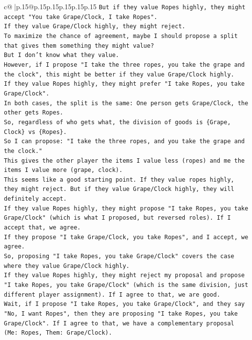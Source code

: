 \documentclass{article}
\begin{document}
{\begin{supertabular}{c@{$\;$}|p{.15\linewidth}@{}p{.15\linewidth}p{.15\linewidth}p{.15\linewidth}p{.15\linewidth}p{.15\linewidth}}
{{{\texttt{But if they value Ropes highly, they might accept "You take Grape/Clock, I take Ropes".} \\
\texttt{If they value Grape/Clock highly, they might reject.} \\
\texttt{To maximize the chance of agreement, maybe I should propose a split that gives them something they might value?} \\
\texttt{But I don't know what they value.} \\
\texttt{However, if I propose "I take the three ropes, you take the grape and the clock", this might be better if they value Grape/Clock highly.} \\
\texttt{If they value Ropes highly, they might prefer "I take Ropes, you take Grape/Clock".} \\
\texttt{In both cases, the split is the same: One person gets Grape/Clock, the other gets Ropes.} \\
\texttt{So, regardless of who gets what, the division of goods is \{Grape, Clock\} vs \{Ropes\}.} \\
\texttt{So I can propose: "I take the three ropes, and you take the grape and the clock."} \\
\texttt{This gives the other player the items I value less (ropes) and me the items I value more (grape, clock).} \\
\texttt{This seems like a good starting point. If they value ropes highly, they might reject. But if they value Grape/Clock highly, they will definitely accept.} \\
\texttt{If they value Ropes highly, they might propose "I take Ropes, you take Grape/Clock" (which is what I proposed, but reversed roles). If I accept that, we agree.} \\
\texttt{If they propose "I take Grape/Clock, you take Ropes", and I accept, we agree.} \\
\texttt{So, proposing "I take Ropes, you take Grape/Clock" covers the case where they value Grape/Clock highly.} \\
\texttt{If they value Ropes highly, they might reject my proposal and propose "I take Ropes, you take Grape/Clock" (which is the same division, just different player assignment). If I agree to that, we are good.} \\
\texttt{Wait, if I propose "I take Ropes, you take Grape/Clock", and they say "No, I want Ropes", then they are proposing "I take Ropes, you take Grape/Clock". If I agree to that, we have a complementary proposal (Me: Ropes, Them: Grape/Clock).} \\
}}}
\end{supertabular}}
\end{document}
